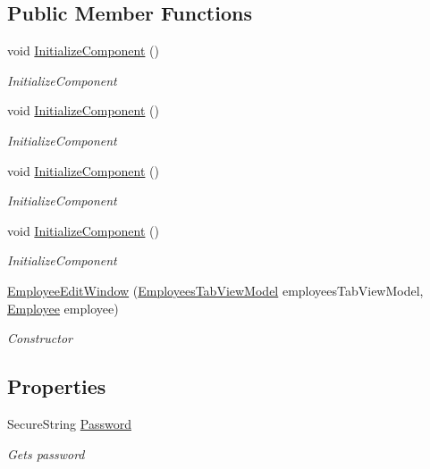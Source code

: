 \subsection*{Public Member Functions}
\begin{DoxyCompactItemize}
\item 
void \hyperlink{class_baudi_1_1_client_1_1_view_1_1_edit_windows_1_1_employee_edit_window_a5bd50ecaf54f1dc55d728e6cf920b901}{Initialize\+Component} ()
\begin{DoxyCompactList}\small\item\em Initialize\+Component \end{DoxyCompactList}\item 
void \hyperlink{class_baudi_1_1_client_1_1_view_1_1_edit_windows_1_1_employee_edit_window_a5bd50ecaf54f1dc55d728e6cf920b901}{Initialize\+Component} ()
\begin{DoxyCompactList}\small\item\em Initialize\+Component \end{DoxyCompactList}\item 
void \hyperlink{class_baudi_1_1_client_1_1_view_1_1_edit_windows_1_1_employee_edit_window_a5bd50ecaf54f1dc55d728e6cf920b901}{Initialize\+Component} ()
\begin{DoxyCompactList}\small\item\em Initialize\+Component \end{DoxyCompactList}\item 
void \hyperlink{class_baudi_1_1_client_1_1_view_1_1_edit_windows_1_1_employee_edit_window_a5bd50ecaf54f1dc55d728e6cf920b901}{Initialize\+Component} ()
\begin{DoxyCompactList}\small\item\em Initialize\+Component \end{DoxyCompactList}\item 
\hyperlink{class_baudi_1_1_client_1_1_view_1_1_edit_windows_1_1_employee_edit_window_a1f1cc1dd1565b2b16d7061288dc01306}{Employee\+Edit\+Window} (\hyperlink{class_baudi_1_1_client_1_1_view_models_1_1_tabs_view_models_1_1_employees_tab_view_model}{Employees\+Tab\+View\+Model} employees\+Tab\+View\+Model, \hyperlink{class_baudi_1_1_d_a_l_1_1_models_1_1_employee}{Employee} employee)
\begin{DoxyCompactList}\small\item\em Constructor \end{DoxyCompactList}\end{DoxyCompactItemize}
\subsection*{Properties}
\begin{DoxyCompactItemize}
\item 
Secure\+String \hyperlink{class_baudi_1_1_client_1_1_view_1_1_edit_windows_1_1_employee_edit_window_ae0ea48c8ec380d772b8e0118cd740e59}{Password}
\begin{DoxyCompactList}\small\item\em Gets password \end{DoxyCompactList}\end{DoxyCompactItemize}


